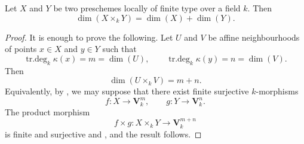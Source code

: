 \begin{corollary}[4.1.5]
\label{IV.4.1.5}
Let $X$ and $Y$ be two preschemes locally of finite type over a field $k$.
Then
\[
\dim(X\times_k Y)=\dim(X)+\dim(Y).
\]
\end{corollary}

\begin{proof}
It is enough to prove the following.
Let $U$ and $V$ be affine neighbourhoods of points $x\in X$ and $y\in Y$ such that
\[
\operatorname{tr.deg}_k\kappa(x)=m=\dim(U),
\qquad
\operatorname{tr.deg}_k\kappa(y)=n=\dim(V).
\]
Then
\[
\dim(U\times_k V)=m+n.
\]
Equivalently, by , we may suppose that there exist finite surjective $k$-morphisms
\[
f:X\longrightarrow\mathbf{V}_k^m,
\qquad
g:Y\longrightarrow\mathbf{V}_k^n.
\]
The product morphism
\[
f\times g:X\times_k Y\longrightarrow\mathbf{V}_k^{m+n}
\]
is finite and surjective  and , and the result follows.
\end{proof}

